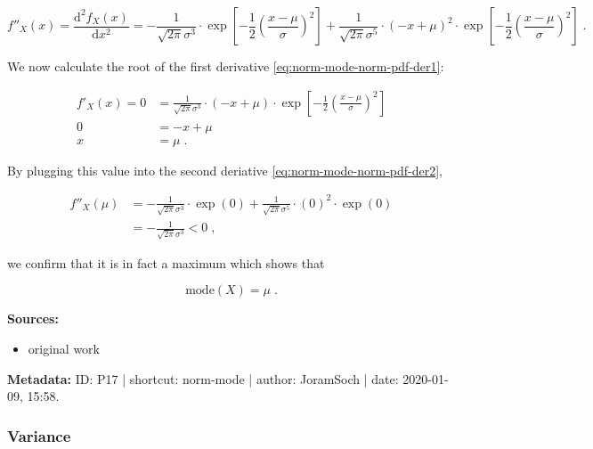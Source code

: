 \documentclass[a4paper,12pt]{book}
\begin{document}
\begin{equation} \label{eq:norm-mode-norm-pdf-der2}
f''_X(x) = \frac{\mathrm{d}^2f_X(x)}{\mathrm{d}x^2} = -\frac{1}{\sqrt{2 \pi} \sigma^3} \cdot \exp \left[ -\frac{1}{2} \left( \frac{x-\mu}{\sigma} \right)^2 \right] + \frac{1}{\sqrt{2 \pi} \sigma^5} \cdot (-x + \mu)^2 \cdot \exp \left[ -\frac{1}{2} \left( \frac{x-\mu}{\sigma} \right)^2 \right] \; .
\end{equation}

We now calculate the root of the first derivative \eqref{eq:norm-mode-norm-pdf-der1}:

\begin{equation} \label{eq:norm-mode-norm-mode-s1}
\begin{split}
f'_X(x) = 0 &= \frac{1}{\sqrt{2 \pi} \sigma^3} \cdot (-x + \mu) \cdot \exp \left[ -\frac{1}{2} \left( \frac{x-\mu}{\sigma} \right)^2 \right] \\
0 &= -x + \mu \\
x &= \mu \; .
\end{split}
\end{equation}

By plugging this value into the second deriative \eqref{eq:norm-mode-norm-pdf-der2},

\begin{equation} \label{eq:norm-mode-norm-mode-s2}
\begin{split}
f''_X(\mu) &= -\frac{1}{\sqrt{2 \pi} \sigma^3} \cdot \exp(0) + \frac{1}{\sqrt{2 \pi} \sigma^5} \cdot (0)^2 \cdot \exp(0) \\
&= -\frac{1}{\sqrt{2 \pi} \sigma^3} < 0 \; ,
\end{split}
\end{equation}

we confirm that it is in fact a maximum which shows that

\begin{equation} \label{eq:norm-mode-norm-mode-qed}
\mathrm{mode}(X) = \mu \; .
\end{equation}

\vspace{1em}
\textbf{Sources:}
\begin{itemize}
\item original work\end{itemize}


\vspace{1em}
\textbf{Metadata:} ID: P17 | shortcut: norm-mode | author: JoramSoch | date: 2020-01-09, 15:58.


\subsubsection[\textbf{Variance}]{Variance} \label{sec:norm-var}
\end{document}

